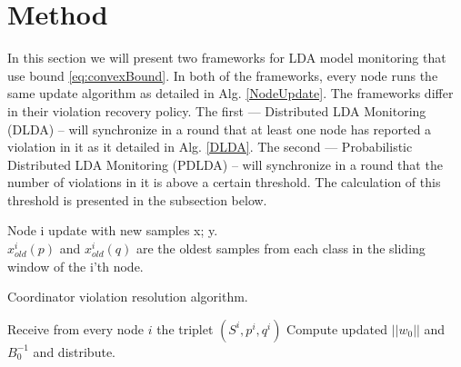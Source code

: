\documentclass{sig-alternate-05-2015}
\begin{document}
\section{Method}
In this section we will present two frameworks for LDA model monitoring that use
bound \ref{eq:convexBound}. In both of the frameworks, every node runs the same
update algorithm as detailed in Alg. \ref{NodeUpdate}. 
The frameworks differ in their violation recovery policy. 
The first --- Distributed LDA Monitoring (DLDA) -- will synchronize in a round
that at least one node has reported a violation in it as it detailed in Alg.
\ref{DLDA}.
The second --- Probabilistic Distributed LDA Monitoring (PDLDA) -- will synchronize in
a round that the number of violations in it is above a certain threshold.
The calculation of this threshold is presented in the subsection below.


\begin{algorithm}
\caption{Node i update with new samples x; y.
\\$x_{old}^i(p)$ and $x_{old}^i(q)$ are the oldest samples from each class in the
sliding window of the i'th node.}\label{NodeUpdate}
\end{algorithm}

\begin{algorithm}
\caption{Coordinator violation resolution algorithm.}\label{DLDA}
\begin{algorithmic}[1]
\State Receive from every node $i$ the triplet $(S^i,p^i,q^i)$
\State Compute updated $||w_0||$ and $B_0^{-1}$ and distribute.
\EndIf
\EndProcedure
\end{algorithmic}
\end{algorithm}
\end{document}
